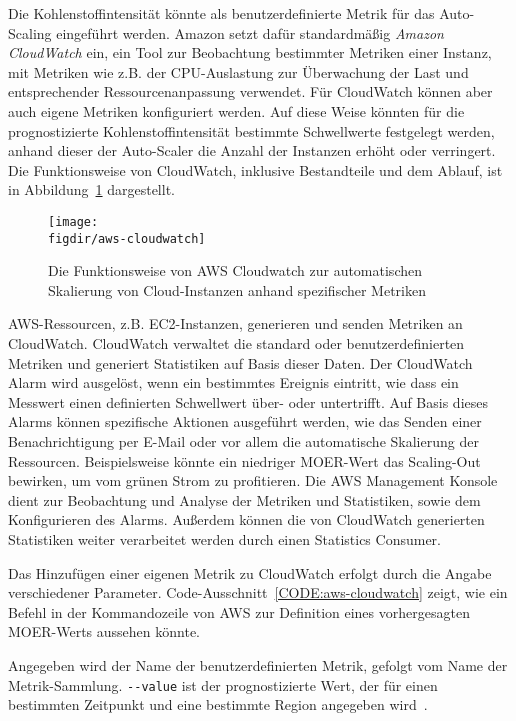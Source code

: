 
Die Kohlenstoffintensität könnte als benutzerdefinierte Metrik für das Auto-Scaling eingeführt werden.
Amazon setzt dafür standardmäßig \textit{Amazon CloudWatch} ein, ein Tool zur Beobachtung bestimmter Metriken einer Instanz, mit Metriken wie z.B. der \ac{CPU}-Auslastung zur Überwachung der Last und entsprechender Ressourcenanpassung verwendet.
Für CloudWatch können aber auch eigene Metriken konfiguriert werden.
Auf diese Weise könnten für die prognostizierte Kohlenstoffintensität bestimmte Schwellwerte festgelegt werden, anhand dieser der Auto-Scaler die Anzahl der Instanzen erhöht oder verringert.
Die Funktionsweise von CloudWatch, inklusive Bestandteile und dem Ablauf, ist in Abbildung~\ref{FIG:aws-cloudwatch} dargestellt.
\begin{figure}
 \caption[Funktionsweise AWS Cloudwatch]{Die Funktionsweise von AWS Cloudwatch zur automatischen Skalierung von Cloud-Instanzen anhand spezifischer Metriken~\cite{AmazonWebServices.20240320T16:42:17.000Z}}
 {\texttt{[image: \\figdir/aws-cloudwatch]}}
 \label{FIG:aws-cloudwatch}
\end{figure}
AWS-Ressourcen, z.B. EC2-Instanzen, generieren und senden Metriken an CloudWatch.
CloudWatch verwaltet die standard oder benutzerdefinierten Metriken und generiert Statistiken auf Basis dieser Daten.
Der CloudWatch Alarm wird ausgelöst, wenn ein bestimmtes Ereignis eintritt, wie dass ein Messwert einen definierten Schwellwert über- oder untertrifft.
Auf Basis dieses Alarms können spezifische Aktionen ausgeführt werden, wie das Senden einer Benachrichtigung per E-Mail oder vor allem die automatische Skalierung der Ressourcen.
Beispielsweise könnte ein niedriger \ac{MOER}-Wert das Scaling-Out bewirken, um vom grünen Strom zu profitieren.
Die AWS Management Konsole dient zur Beobachtung und Analyse der Metriken und Statistiken, sowie dem Konfigurieren des Alarms.
Außerdem können die von CloudWatch generierten Statistiken weiter verarbeitet werden durch einen Statistics Consumer.

Das Hinzufügen einer eigenen Metrik zu CloudWatch erfolgt durch die Angabe verschiedener Parameter.
Code-Ausschnitt~\ref{CODE:aws-cloudwatch} zeigt, wie ein Befehl in der Kommandozeile von AWS zur Definition eines vorhergesagten \ac{MOER}-Werts aussehen könnte.

Angegeben wird der Name der benutzerdefinierten Metrik, gefolgt vom Name der Metrik-Sammlung.
\lstinline[columns=fixed]{--value} ist der prognostizierte Wert, der für einen bestimmten Zeitpunkt und eine bestimmte Region angegeben wird~\cite{AmazonWebServices.20240320T16:42:17.000Z}.

